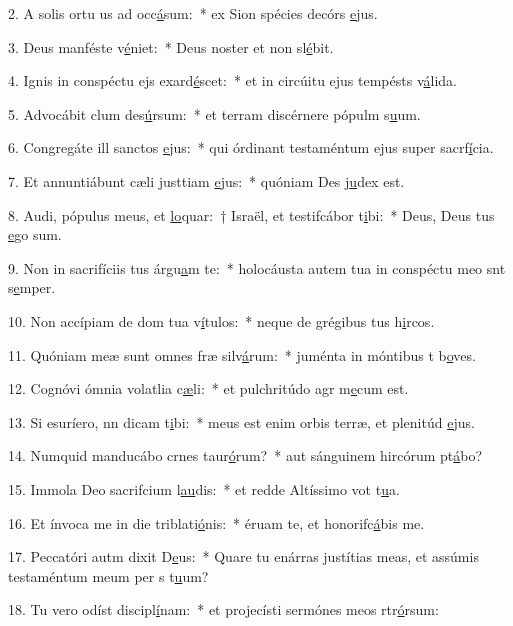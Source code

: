 2. A solis ortu us ad occ\uline{á}sum:~* ex Sion spécies decórs \uline{e}jus.\par 
3. Deus manféste v\uline{é}niet:~* Deus noster et non sl\uline{é}bit.\par 
4. Ignis in conspéctu ejs exard\uline{é}scet:~* et in circúitu ejus tempésts v\uline{á}lida.\par 
5. Advocábit clum des\uline{ú}rsum:~* et terram discérnere pópulm s\uline{u}um.\par 
6. Congregáte ill sanctos \uline{e}jus:~* qui órdinant testaméntum ejus super sacrf\uline{í}cia.\par 
7. Et annuntiábunt cæli justtiam \uline{e}jus:~* quóniam Des j\uline{u}dex est.\par 
8. Audi, pópulus meus, et \uline{lo}quar:~† Israël, et testifcábor t\uline{i}bi:~* Deus, Deus tus \uline{e}go sum.\par 
9. Non in sacrifíciis tus árgu\uline{a}m te:~* holocáusta autem tua in conspéctu meo snt s\uline{e}mper.\par 
10. Non accípiam de dom tua v\uline{í}tulos:~* neque de grégibus tus h\uline{i}rcos.\par 
11. Quóniam meæ sunt omnes fræ silv\uline{á}rum:~* juménta in móntibus t b\uline{o}ves.\par 
12. Cognóvi ómnia volatlia c\uline{æ}li:~* et pulchritúdo agr m\uline{e}cum est.\par 
13. Si esuríero, nn dicam t\uline{i}bi:~* meus est enim orbis terræ, et plenitúd \uline{e}jus.\par 
14. Numquid manducábo crnes taur\uline{ó}rum?~* aut sánguinem hircórum pt\uline{á}bo?\par 
15. Immola Deo sacrifcium l\uline{au}dis:~* et redde Altíssimo vot t\uline{u}a.\par 
16. Et ínvoca me in die triblati\uline{ó}nis:~* éruam te, et honorifc\uline{á}bis me.\par 
17. Peccatóri autm dixit D\uline{e}us:~* Quare tu enárras justítias meas, et assúmis testaméntum meum per s t\uline{u}um?\par 
18. Tu vero odíst discipl\uline{í}nam:~* et projecísti sermónes meos rtr\uline{ó}rsum:\par 
